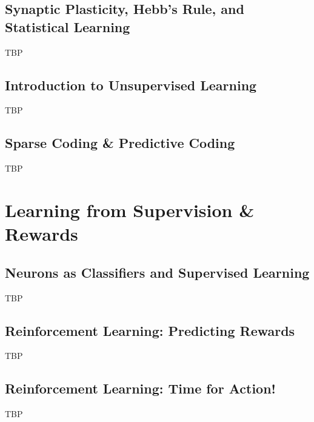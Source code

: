 \documentclass[]{article}
\begin{document}
\subsection{Synaptic Plasticity, Hebb's Rule, and Statistical Learning}
TBP

\subsection{Introduction to Unsupervised Learning}
TBP

\subsection{Sparse Coding \& Predictive Coding}
TBP

\section{Learning from Supervision \& Rewards}\label{sec:week8}

\subsection{Neurons as Classifiers and Supervised Learning}
TBP

\subsection{Reinforcement Learning: Predicting Rewards}
TBP

\subsection{Reinforcement Learning: Time for Action!}
TBP

\appendix

\printglossaries




\end{document}
